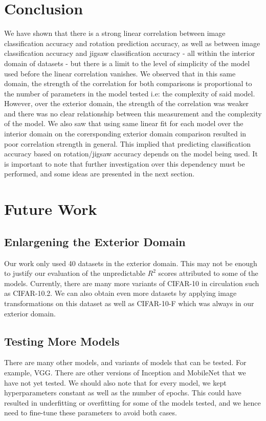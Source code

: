 \documentclass{article}
\begin{document}
\section{Conclusion}
We have shown that there is a strong linear correlation between image classification accuracy and rotation prediction accuracy, as well as between image classification accuracy and jigsaw classification accuracy - all within the interior domain of datasets - but there is a limit to the level of simplicity of the model used before the linear correlation vanishes. We observed that in this same domain, the strength of the correlation for both comparisons is proportional to the number of parameters in the model tested i.e: the complexity of said model. However, over the exterior domain, the strength of the correlation was weaker and there was no clear relationship between this measurement and the complexity of the model. We also saw that using same linear fit for each model over the interior domain on the corersponding exterior domain comparison resulted in poor correlation strength in general. This implied that predicting classification accuracy based on rotation/jigsaw accuracy depends on the model being used. It is important to note that further investigation over this dependency must be performed, and some ideas are presented in the next section.

\section{Future Work}
\subsection{Enlargening the Exterior Domain}
Our work only used 40 datasets in the exterior domain. This may not be enough to justify our evaluation of the unpredictable $R^2$ scores attributed to some of the models. Currently, there are many more variants of CIFAR-10 in circulation such as CIFAR-10.2. We can also obtain even more datasets by applying image transformations on this dataset as well as CIFAR-10-F which was always in our exterior domain.

\subsection{Testing More Models}
There are many other models, and variants of models that can be tested. For example, VGG. There are other versions of Inception and MobileNet that we have not yet tested. We should also note that for every model, we kept hyperparameters constant as well as the number of epochs. This could have resulted in underfitting or overfitting for some of the models tested, and we hence need to fine-tune these parameters to avoid both cases.
\end{document}
